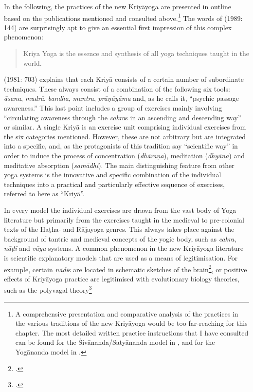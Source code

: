 In the following, the practices of the new Kriyāyoga are presented in outline based on the publications mentioned and consulted above.\footnote{A comprehensive presentation and comparative analysis of the practices in the various traditions of the new Kriyāyoga would be too far-reaching for this chapter. The most detailed written practice instructions that I have consulted can be found for the Śivānanda/Satyānanda model in \citeauthor[1981: 697-952]{kriyayogasarasvati1981}, and for the Yogānanda model in \citeauthor[2013: 249-340]{kriyayoganityananda2013}.} The words of \citeauthor{hariharananda1989} (1989: 144) are surprisingly apt to give an essential first impression of this complex phenomenon: \begin{quote} Kriya Yoga is the essence and synthesis of all yoga techniques taught in the world.  \end{quote} 
\citeauthor{kriyayogasarasvati1981} (1981: 703) explains that each Kriyā consists of a certain number of subordinate techniques. These always consist of a combination of the following six tools: \textit{āsana}, \textit{mudrā}, \textit{bandha}, \textit{mantra}, \textit{prāṇāyāma} and, as he calls it, ``psychic passage awareness.'' This last point includes a group of exercises mainly involving ``circulating awareness through the \textit{cakra}s in an ascending and descending way'' or similar. A single Kriyā is an exercise unit comprising individual exercises from the six categories mentioned. However, these are not arbitrary but are integrated into a specific, and, as the protagonists of this tradition say ``scientific way'' in order to induce the process of concentration (\textit{dhāraṇa}), meditation (\textit{dhyāna}) and meditative absorption (\textit{samādhi}). The main distinguishing feature from other yoga systems is the innovative and specific combination of the individual techniques into a practical and particularly effective sequence of exercises, referred to here as ``Kriyā''.

In every model the individual exercises are drawn from the vast body of Yoga literature but primarily from the exercises taught in the medieval to pre-colonial texts of the Haṭha- and Rājayoga genres. This always takes place against the background of tantric and medieval concepts of the yogic body, such as \textit{cakra}, \textit{nāḍī} and \textit{vāyu} systems. A common phenomenon in the new Kriyāyoga literature is scientific explanatory models that are used as a means of legitimisation. For example, certain \textit{nāḍī}s are located in schematic sketches of the brain\footnote{\citeauthor[2013: 215]{kriyayoganityananda2013}.}, or positive effects of Kriyāyoga practice are legitimised with evolutionary biology theories, such as the polyvagal theory\footnote{\citeauthor[2021: 188]{kriyayogalowenstein}.}

